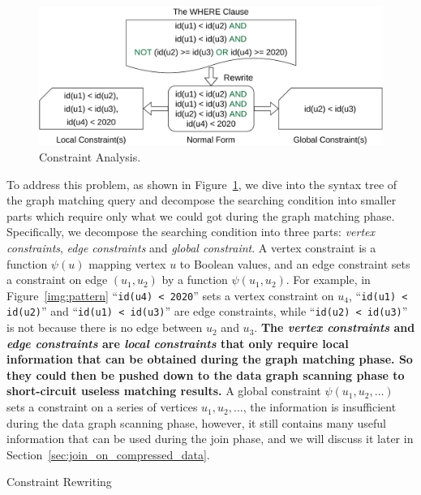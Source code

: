 \begin{figure}[ht]
  \centering
  \includegraphics[width=.45\textwidth]{img/constraints.pdf}
  \caption{Constraint Analysis.}\label{img:constraints}
\end{figure}

To address this problem, as shown in Figure~\ref{img:constraints},
we dive into the syntax tree of the graph matching query and decompose the searching condition into smaller parts which require only what we could got during the graph matching phase.
Specifically, we decompose the searching condition into three parts: \emph{vertex constraints}, \emph{edge constraints} and \emph{global constraint}.
A vertex constraint is a function $\psi(u)$ mapping vertex $u$ to Boolean values,
and an edge constraint sets a constraint on edge $(u_1, u_2)$ by a function $\psi(u_1, u_2)$.
For example, in Figure~\ref{img:pattern} ``\texttt{id(u4) < 2020}'' sets a vertex constraint on $u_4$,
``\texttt{id(u1) < id(u2)}'' and ``\texttt{id(u1) < id(u3)}'' are edge constraints,
while ``\texttt{id(u2) < id(u3)}'' is not because there is no edge between $u_2$ and $u_3$.
\textbf{The \emph{vertex constraints} and \emph{edge constraints} are \emph{local constraints} that only require local information that can be obtained during the graph matching phase.
So they could then be pushed down to the data graph scanning phase to short-circuit useless matching results.}
A global constraint $\psi(u_1, u_2, \dots)$ sets a constraint on a series of vertices $u_1, u_2, \dots$,
the information is insufficient during the data graph scanning phase,
however, it still contains many useful information that can be used during the join phase,
and we will discuss it later in Section~\ref{sec:join_on_compressed_data}.

\begin{algorithm}[ht]
  \caption{Constraint Rewriting}\label{alg:rewrite}
\end{algorithm}

